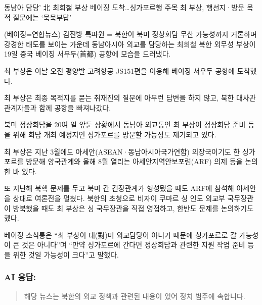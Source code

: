 \documentclass[
  letterpaper,
]{book}
\begin{document}
\begin{tcolorbox}[enhanced jigsaw, opacityback=0, opacitybacktitle=0.6, colback=white, rightrule=.15mm, coltitle=black, colframe=quarto-callout-note-color-frame, colbacktitle=quarto-callout-note-color!10!white, bottomrule=.15mm, bottomtitle=1mm, breakable, title=\textcolor{quarto-callout-note-color}{\faInfo}\hspace{0.5em}{프롬프트: 뉴스기사를 다음 중 하나 범주로 분류해야 합니다; 정치, 경제,
사회, 생활/문화, 세계, 기술/IT, 연예, 스포츠.}, titlerule=0mm, leftrule=.75mm, toptitle=1mm, left=2mm, arc=.35mm, toprule=.15mm]

동남아 담당' 北 최희철 부상 베이징 도착\ldots 싱가포르행 주목 최 부상,
행선지·방문 목적 질문에는 `묵묵부답'

(베이징=연합뉴스) 김진방 특파원 = 북한이 북미 정상회담 무산 가능성까지
거론하며 강경한 태도를 보이는 가운데 동남아시아 외교를 담당하는 최희철
북한 외무성 부상이 19일 중국 베이징 서우두(首都) 공항에 모습을 드러냈다.

최 부상은 이날 오전 평양발 고려항공 JS151편을 이용해 베이징 서우두
공항에 도착했다.

최 부상은 최종 목적지를 묻는 취재진의 질문에 아무런 답변을 하지 않고,
북한 대사관 관계자들과 함께 공항을 빠져나갔다.

북미 정상회담을 20여 일 앞둔 상황에서 동남아 외교통인 최 부상이 정상회담
준비 등을 위해 회담 개최 예정지인 싱가포르를 방문할 가능성도 제기되고
있다.

최 부상은 지난 3월에도 아세안(ASEAN·동남아시아국가연합) 의장국이기도 한
싱가포르를 방문해 양국관계와 올해 8월 열리는 아세안지역안보포럼(ARF)
의제 등을 논의한 바 있다.

또 지난해 북핵 문제를 두고 북미 간 긴장관계가 형성됐을 때도 ARF에 참석해
아세안을 상대로 여론전을 펼쳤다. 북한의 초청으로 비자이 쿠마르 싱 인도
외교부 국무장관이 방북했을 때도 최 부상은 싱 국무장관을 직접 영접하고,
한반도 문제를 논의하기도 했다.

베이징 소식통은 ``최 부상이 대(對)미 외교담당이 아니기 때문에 싱가포르로
갈 가능성이 큰 것은 아니다''며 ``만약 싱가포르에 간다면 정상회담과
관련한 지원 작업 준비 등을 위한 것일 가능성이 크다''고 말했다.

\hypertarget{ai-uxc751uxb2f5-5}{%
\subsubsection*{AI 응답:}\label{ai-uxc751uxb2f5-5}}

\begin{quote}
해당 뉴스는 북한의 외교 정책과 관련된 내용이 있어 정치 범주에 속합니다.
\end{quote}

\end{tcolorbox}
\end{document}
